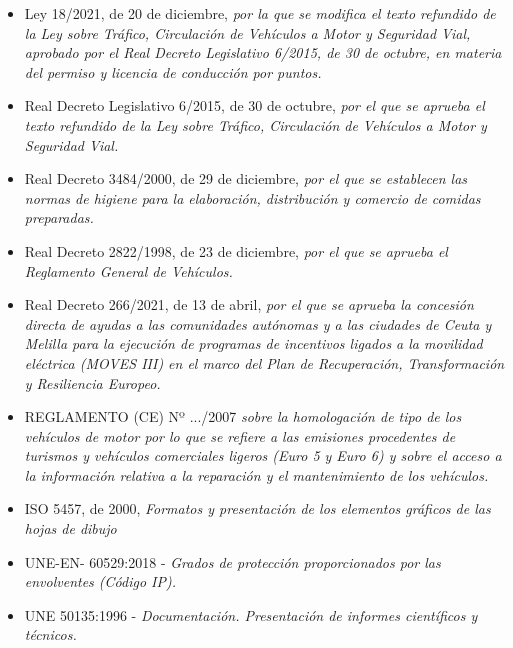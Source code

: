\begin{itemize}

    \item Ley 18/2021, de 20 de diciembre, \textit{por la que se modifica el texto refundido de la Ley sobre Tráfico, Circulación de Vehículos a Motor y Seguridad Vial, aprobado por el Real Decreto Legislativo 6/2015, de 30 de octubre, en materia del permiso y licencia de conducción por puntos.}

    \item Real Decreto Legislativo 6/2015, de 30 de octubre, \textit{por el que se aprueba el texto refundido de la Ley sobre Tráfico, Circulación de Vehículos a Motor y Seguridad Vial.}
    
    \item Real Decreto 3484/2000, de 29 de diciembre, \textit{por el que se establecen las normas de higiene para la elaboración, distribución y comercio de comidas preparadas.}
    
    \item Real Decreto 2822/1998, de 23 de diciembre, \textit{por el que se aprueba el Reglamento General de Vehículos.}
    
    \item Real Decreto 266/2021, de 13 de abril, \textit{por el que se aprueba la concesión directa de ayudas a las comunidades autónomas y a las ciudades de Ceuta y Melilla para la ejecución de programas de incentivos ligados a la movilidad eléctrica (MOVES III) en el marco del Plan de Recuperación, Transformación y Resiliencia Europeo.}
    
    \item REGLAMENTO (CE) Nº .../2007 \textit{sobre la homologación de tipo de los vehículos de motor por lo que se refiere a las emisiones procedentes de turismos y vehículos comerciales ligeros (Euro 5 y Euro 6) y sobre el acceso a la información relativa a la reparación y el mantenimiento de los vehículos.} 
    
    \item ISO 5457, de 2000, \textit{Formatos y presentación de los elementos gráficos de las hojas de dibujo}
    
    
    
    \item UNE-EN- 60529:2018 - \textit{Grados de protección proporcionados por las envolventes (Código IP).}
    
    \item UNE 50135:1996 - \textit{Documentación.  Presentación de informes científicos y técnicos.}
    
    

\end{itemize}


